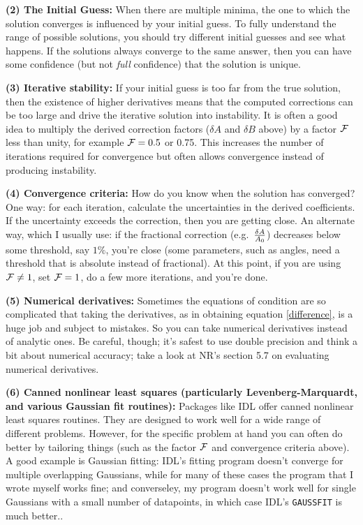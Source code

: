 \documentclass[psfig,preprint]{aastex}
\begin{document}
	{\bf (2) The Initial Guess:} When there are multiple minima,
the one to which the solution converges is influenced by your initial
guess. To fully understand the range of possible solutions, you should
try different initial guesses and see what happens. If the solutions
always converge to the same answer, then you can have some confidence
(but not {\it full} confidence) that the solution is unique.

	{\bf (3) Iterative stability:} If your initial guess is too far
from the true solution, then the existence of higher derivatives means
that the computed corrections can be too large and drive the iterative
solution into instability. It is often a good idea to multiply the
derived correction factors ($\delta A$ and $\delta B$ above) by a factor
${\cal F}$ less than unity, for example ${\cal F} = 0.5$ or 0.75. This
increases the number of iterations required for convergence but often
allows convergence instead of producing instability.

	{\bf (4) Convergence criteria:} How do you know when the
solution has converged? One way: for each iteration, calculate the
uncertainties in the derived coefficients. If the uncertainty exceeds
the correction, then you are getting close. An alternate way, which I
usually use: if the fractional correction (e.g.~$\delta A \over A_0$)
decreases below some threshold, say $1\%$, you're close (some
parameters, such as angles, need a threshold that is absolute instead of
fractional).  At this point, if you are using ${\cal F} \neq 1$, set
${\cal F} = 1$, do a few more iterations, and you're done. 

	{\bf (5) Numerical derivatives:} Sometimes the equations of
condition are so complicated that taking the derivatives, as in
obtaining equation \ref{difference}, is a huge job and subject to
mistakes. So you can take numerical derivatives instead of analytic
ones. Be careful, though; it's safest to use double precision and think
a bit about numerical accuracy; take a look at NR's section 5.7 on
evaluating numerical derivatives.

	{\bf (6) Canned nonlinear least squares (particularly
Levenberg-Marquardt, and various Gaussian fit routines):} Packages like
IDL offer canned nonlinear least squares routines.  They are designed to
work well for a wide range of different problems.  However, for the
specific problem at hand you can often do better by tailoring things
(such as the factor ${\cal F}$ and convergence criteria above).  A good
example is Gaussian fitting: IDL's fitting program doesn't converge for
multiple overlapping Gaussians, while for many of these cases the
program that I wrote myself works fine; and converseley, my program
doesn't work well for single Gaussians with a small number of
datapoints, in which case IDL's \verb$GAUSSFIT$ is much better..
\end{document}
